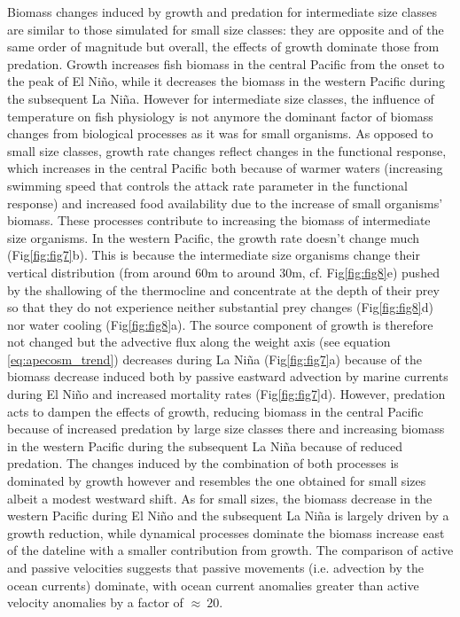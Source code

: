 Biomass changes induced by growth and predation for intermediate size classes are similar to those simulated for small size classes: they are opposite and of the same order of magnitude but overall, the effects of growth dominate those from predation. Growth increases fish biomass in the central Pacific from the onset to the peak of El Niño, while it decreases the biomass in the western Pacific during the subsequent La Niña. However for intermediate size classes, the influence of temperature on fish physiology is not anymore the dominant factor of biomass changes from biological processes as it was for small organisms. As opposed to small size classes, growth rate changes reflect changes in the functional response, which increases in the central Pacific both because of warmer waters (increasing swimming speed that controls the attack rate parameter in the functional response) and increased food availability due to the increase of small organisms' biomass. These processes contribute to increasing the biomass of intermediate size organisms. In the western Pacific, the growth rate doesn't change much (Fig\ref{fig:fig7}b). This is because the intermediate size organisms change their vertical distribution (from around 60m to around 30m, cf. Fig\ref{fig:fig8}e) pushed by the shallowing of the thermocline and concentrate at the depth of their prey so that they do not experience neither substantial prey changes (Fig\ref{fig:fig8}d) nor water cooling (Fig\ref{fig:fig8}a). The source component of growth is therefore not changed but the advective flux along the weight axis (see equation \ref{eq:apecosm_trend}) decreases during La Niña (Fig\ref{fig:fig7}a) because of the biomass decrease induced both by passive eastward advection by marine currents during El Niño and increased mortality rates (Fig\ref{fig:fig7}d). However, predation acts to dampen the effects of growth, reducing biomass in the central Pacific because of increased predation by large size classes there and increasing biomass in the western Pacific during the subsequent La Niña because of reduced predation. The changes induced by the combination of both processes is dominated by growth however and resembles the one obtained for small sizes albeit a modest westward shift. As for small sizes, the biomass decrease in the western Pacific during El Niño and the subsequent La Niña is largely driven by a growth reduction, while dynamical processes dominate the biomass increase east of the dateline with a smaller contribution from growth.  The comparison of active and passive velocities suggests that passive movements (i.e. advection by the ocean currents) dominate, with ocean current anomalies greater than active velocity anomalies by a factor of $\approx\ 20$.


